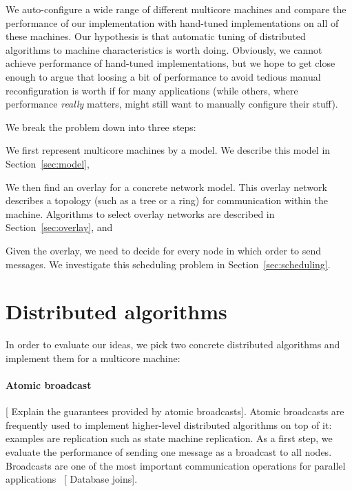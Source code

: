 \documentclass{article}
\newcommand{\stefan}[1]{
  {\color{skRed}[{\color{red}{SK}} #1]}}
\begin{document}
We auto-configure a wide range of different multicore machines and
compare the performance of our implementation with hand-tuned
implementations on all of these machines.
Our hypothesis is that automatic tuning of distributed algorithms 
to machine characteristics is worth
doing. Obviously, we cannot achieve performance of hand-tuned
implementations, but we hope to get close enough to argue that loosing
a bit of performance to avoid tedious manual reconfiguration is worth
if for many applications (while others, where performance
\emph{really} matters, might still want to manually configure their
stuff).

We break the problem down into three steps:
\begin{inparaenum}[\itshape 1\upshape)]
\item We first represent multicore machines by a model. We describe
  this model in Section~\ref{sec:model},
\item We then find an overlay for a concrete network model. This
  overlay network describes a topology (such as a tree or a ring) for
  communication within the machine. Algorithms to select overlay
  networks are described in Section~\ref{sec:overlay}, and
\item Given the overlay, we need to decide for every node in which
  order to send messages. We investigate this scheduling problem in
  Section~\ref{sec:scheduling}.
\end{inparaenum}

\section{Distributed algorithms}
\label{sec:distalgo}

In order to evaluate our ideas, we pick two concrete distributed
algorithms and implement them for a multicore machine:

\paragraph{Atomic broadcast} \stefan{Explain the guarantees provided
  by atomic broadcasts}. Atomic broadcasts are frequently used to
implement higher-level distributed algorithms on top of it: examples
are replication such as state machine replication. As a first step, we
evaluate the performance of sending one message as a broadcast to all
nodes. Broadcasts are one of the most important communication
operations for parallel applications~\cite{Bruck1992} \stefan{Database
  joins}.
\end{document}
